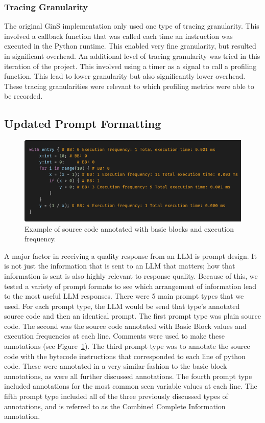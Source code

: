 \documentclass[sigconf]{acmart}
\begin{document}
\subsubsection{Tracing Granularity}
The original GinS implementation only used one type of tracing granularity.
This involved a callback function that was called each time an instruction was executed in the Python runtime.
This enabled very fine granularity, but resulted in significant overhead.
An additional level of tracing granularity was tried in this iteration of the project.
This involved using a timer as a signal to call a profiling function. This lead to lower granularity but also significantly lower overhead.
These tracing granularities were relevant to which profiling metrics were able to be recorded.

\subsection{Updated Prompt Formatting}

\begin{figure}
    \centering
    \includegraphics[width=1\linewidth]{images/Picture2.png}
    \caption{Example of source code annotated with basic blocks and execution frequency.}
    \label{fig:annotations}
\end{figure}

A major factor in receiving a quality response from an LLM is prompt design.
It is not just the information that is sent to an LLM that matters; how that information is sent is also highly relevant to response quality.
Because of this, we tested a variety of prompt formats to see which arrangement of information lead to the most useful LLM responses.
There were 5 main prompt types that we used.
For each prompt type, the LLM would be send that type's annotated source code and then an identical prompt.
The first prompt type was plain source code.
The second was the source code annotated with Basic Block values and execution frequencies at each line.
Comments were used to make these annotations (see Figure~\ref{fig:annotations}).
The third prompt type was to annotate the source code with the bytecode instructions that corresponded to each line of python code.
These were annotated in a very similar fashion to the basic block annotations, as were all further discussed annotations.
The fourth prompt type included annotations for the most common seen variable values at each line.
The fifth prompt type included all of the three previously discussed types of annotations, and is referred to as the Combined Complete Information annotation.
\end{document}
